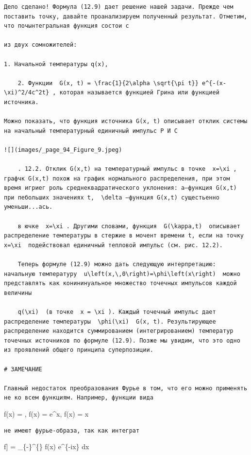 \documentclass[
  ukrainian,
]{article}
\begin{document}
\begin{verbatim}
Дело сделано! Формула (12.9) дает решение нашей задачи. Прежде чем поставить точку, давайте проанализируем полученный результат. Отметим, что почынтегральная функция состои с

из двух сомножителей:

1. Начальной температуры q(x),

    2. Функции  G(x, t) = \frac{1}{2\alpha \sqrt{\pi t}} e^{-(x-\xi)^2/4c^2t} , которая называется функцией Грина или функцией источника.

Можно показать, что функция источника G(x, t) описывает отклик системы на начальный температурный единичный импульс Р И С

![](images/_page_94_Figure_9.jpeg)

    . 12.2. Отклик G(x,t) на температурный импульс в точке  x=\xi , графчк G(x,t) похож на график нормального распределения, при этом время игриег роль среднеквадратического уклонения: a—функция G(x,t) при пебольших значениях t,  \delta —функция G(x,t) сущестьенно уменьши...ась.

    в ючке  x=\xi . Другими словами, функция  G(\kappa,t)  описывает распределение температуры в стержие в мочент времени t, если на точку  x=\xi  подействовал единичный тепловой импульс (см. рис. 12.2).

    Теперь формуле (12.9) можно дать следующую интерпретацию: начальную температуру  u\left(x,\,0\right)=\phi\left(x\right)  можно представлять как конининуальное множество точечных импульсов каждой величины

    q(\xi)  (в точке  x = \xi ). Каждый точечный импульс дает распределение температуры  \phi(\xi)  G(x, t). Результирующее распределение находится суммированием (интегрированием) температур точечных источников по формуле (12.9). Позже мы увидим, что это одно из проявлений общего принципа суперпозиции.

# ЗАМЕЧАНИЕ

Главный недостаток преобразования Фурье в том, что его можно применять не ко всем функциям. Например, функции вида
\end{verbatim}

f(x) = , f(x) = e\^{}x, f(x) = \sin x

\begin{verbatim}
не имеют фурье-образа, так как интеграт
\end{verbatim}

\mathcal{F}{[}f{]} =  \int\_\{-\pi\}\^{}\{\pi\}
f(x) e\^{}\{-i\xi x\} dx
\end{document}
